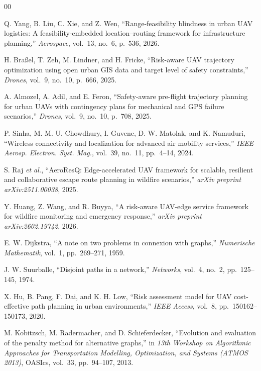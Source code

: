\documentclass[conference]{IEEEtran}
\begin{document}
\begin{thebibliography}{00}

 Q. Yang, B. Liu, C. Xie, and Z. Wen, ``Range-feasibility blindness in urban UAV logistics: A feasibility-embedded location--routing framework for infrastructure planning,'' \emph{Aerospace}, vol.~13, no.~6, p.~536, 2026.

 H. Braßel, T. Zeh, M. Lindner, and H. Fricke, ``Risk-aware UAV trajectory optimization using open urban GIS data and target level of safety constraints,'' \emph{Drones}, vol.~9, no.~10, p.~666, 2025.

 A. Almozel, A. Adil, and E. Feron, ``Safety-aware pre-flight trajectory planning for urban UAVs with contingency plans for mechanical and GPS failure scenarios,'' \emph{Drones}, vol.~9, no.~10, p.~708, 2025.

 P. Sinha, M. M. U. Chowdhury, I. Guvenc, D. W. Matolak, and K. Namuduri, ``Wireless connectivity and localization for advanced air mobility services,'' \emph{IEEE Aerosp. Electron. Syst. Mag.}, vol.~39, no.~11, pp.~4--14, 2024.

 S. Raj \emph{et al.}, ``AeroResQ: Edge-accelerated UAV framework for scalable, resilient and collaborative escape route planning in wildfire scenarios,'' \emph{arXiv preprint arXiv:2511.00038}, 2025.

 Y. Huang, Z. Wang, and R. Buyya, ``A risk-aware UAV-edge service framework for wildfire monitoring and emergency response,'' \emph{arXiv preprint arXiv:2602.19742}, 2026.

 E. W. Dijkstra, ``A note on two problems in connexion with graphs,'' \emph{Numerische Mathematik}, vol.~1, pp.~269--271, 1959.

 J. W. Suurballe, ``Disjoint paths in a network,'' \emph{Networks}, vol.~4, no.~2, pp.~125--145, 1974.

 X. Hu, B. Pang, F. Dai, and K. H. Low, ``Risk assessment model for UAV cost-effective path planning in urban environments,'' \emph{IEEE Access}, vol.~8, pp.~150162--150173, 2020.

 M. Kobitzsch, M. Radermacher, and D. Schieferdecker, ``Evolution and evaluation of the penalty method for alternative graphs,'' in \emph{13th Workshop on Algorithmic Approaches for Transportation Modelling, Optimization, and Systems (ATMOS 2013)}, OASIcs, vol.~33, pp.~94--107, 2013.


\end{thebibliography}
\end{document}
